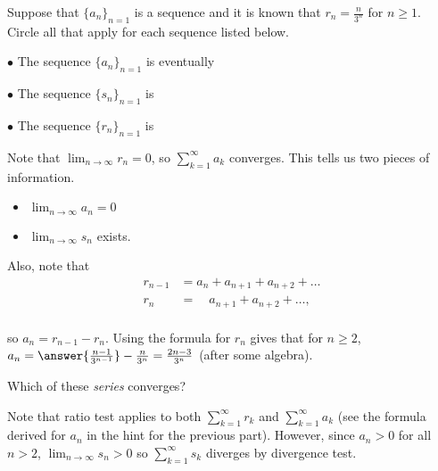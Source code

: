 \documentclass{ximera}
\author{Jim Talamo}
\begin{document}
\begin{exercise}

Suppose that $\{a_n\}_{n=1}$ is a sequence and it is known that $r_n = \frac{n}{3^n}$ for $n \geq 1$. Circle all that apply for each sequence listed below.

$\bullet$ The sequence $\{a_n\}_{n=1}$ is eventually
\begin{selectAll}
\end{selectAll}

$\bullet$ The sequence $\{s_n\}_{n=1}$ is
\begin{selectAll}
\end{selectAll}

$\bullet$ The sequence $\{r_n\}_{n=1}$ is 
\begin{selectAll}
\end{selectAll}

\begin{hint}
Note that $\lim_{n \to \infty} r_n =0$, so $\sum_{k=1}^{\infty} a_k$ converges.  This tells us two pieces of information.

\begin{itemize}
\item $\lim_{n \to \infty} a_n =0$
\item $\lim_{n \to \infty} s_n$ exists.
\end{itemize}

Also, note that 
\begin{align*}
r_{n-1} &= a_n+a_{n+1}+a_{n+2}+\ldots \\
r_{n} &= \phantom{a_n}  a_{n+1}+a_{n+2}+\ldots ,\\
\end{align*}

so $a_n = r_{n-1}-r_n$.  Using the formula for $r_n$ gives that for $n \geq 2$,  $a_n = \answer{\frac{n-1}{3^{n-1}}}-\frac{n}{3^n} = \frac{2n-3}{3^n}$ (after some algebra). 

\end{hint}

\begin{exercise}
Which of these \emph{series} converges?
\begin{selectAll}
\end{selectAll}
\end{exercise}

\begin{hint}
Note that ratio test applies to both $\sum_{k=1}^{\infty} r_k$ and $\sum_{k=1}^{\infty} a_k$ (see the formula derived for $a_n$ in the hint for the previous part).  However, since $a_n > 0$ for all $n>2$, $\lim_{n \to \infty} s_n >0$ so $\sum_{k=1}^{\infty} s_k$ diverges by divergence test.
\end{hint}
\end{exercise}
\end{document}

